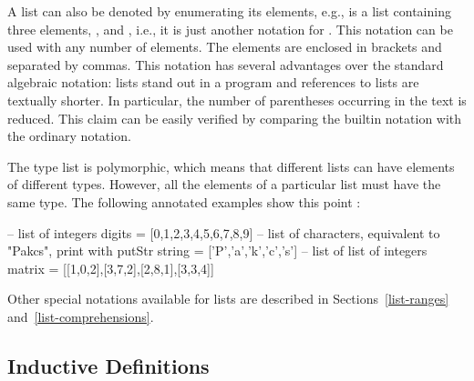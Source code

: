 A list can also be denoted by enumerating its
elements, e.g.,
\ccode{[u,v,w]} is a list containing three elements,
,  and , i.e., it is just another
notation for .
This notation can be used with any number of elements.
The elements are enclosed in brackets and separated by commas.
This notation has several advantages over the standard algebraic
notation: lists stand out in a program and references to lists
are textually shorter.  In particular, the number of parentheses
occurring in the text is reduced.
This claim can be easily verified by comparing the builtin
notation with the ordinary notation.

The type list is polymorphic, which means that
different lists can have elements of different types.
However, all the elements of a particular list must have the same type.
The following annotated examples show this point
:
%
\begin{prog}
-- list of integers
digits = [0,1,2,3,4,5,6,7,8,9]
\vspace*{1.5ex}
-- list of characters, equivalent to "Pakcs", print with putStr
string = ['P','a','k','c','s'] 
\vspace*{1.5ex}
-- list of list of integers
matrix = [[1,0,2],[3,7,2],[2,8,1],[3,3,4]]
\end{prog}
%
Other special notations available for lists are described in 
Sections~\ref{list-ranges} and~\ref{list-comprehensions}.

\subsection{Inductive Definitions}

